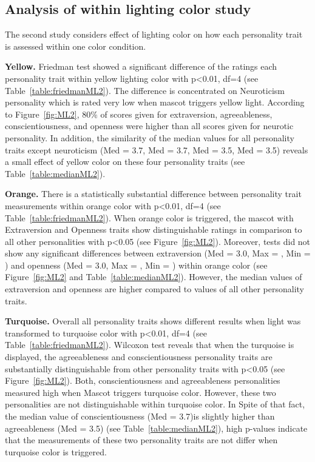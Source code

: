 \subsection{Analysis of within lighting color study}
\label{subsec:MLstudy2}
The second study considers effect of lighting color on how each
personality trait is assessed within one color condition.

\par\textbf{Yellow.}
Friedman test showed a significant difference of the ratings each personality trait
within yellow lighting color with p<0.01, df=4 (see Table~\ref{table:friedmanML2}).
The difference is concentrated on Neuroticism personality which is rated very low when mascot triggers yellow light.
According to Figure~\ref{fig:ML2}, 80\% of scores given for extraversion, agreeableness,
conscientiousness, and openness were higher than all scores given for neurotic personality.
In addition, the similarity of the median values for all personality traits except
neuroticism (Med = 3.7, Med = 3.7, Med = 3.5, Med = 3.5) reveals a small effect of yellow
color on these four personality traits (see Table~\ref{table:medianML2}).

\par\textbf{Orange.}
There is a statistically substantial difference between personality trait measurements within
orange color with p<0.01, df=4 (see Table~\ref{table:friedmanML2}).
When orange color is triggered, the mascot with Extraversion and Openness traits
show distinguishable ratings in comparison to all other personalities with p<0.05 (see Figure~\ref{fig:ML2}).
Moreover, tests did not show any significant differences between extraversion (Med = 3.0, Max = , Min = )
and openness (Med = 3.0, Max = , Min = ) within orange color (see Figure~\ref{fig:ML2} and Table~\ref{table:medianML2}).
However, the median values of extraversion and openness are higher compared to values of all other personality traits.

\par\textbf{Turquoise.}
Overall all personality traits shows different results when light was transformed to turquoise color
with p<0.01, df=4 (see Table~\ref{table:friedmanML2}).
Wilcoxon test reveals that when the turquoise is displayed, the agreeableness and conscientiousness
personality traits are substantially distinguishable from other personality traits with p<0.05 (see Figure~\ref{fig:ML2}).
Both, conscientiousness and agreeableness personalities measured high when Mascot triggers  turquoise color.
However, these two personalities are not distinguishable within turquoise color.
In Spite of that fact, the median value of conscientiousness (Med = 3.7)is slightly higher than
agreeableness (Med = 3.5) (see Table~\ref{table:medianML2}), high p-values indicate that the measurements of
these two personality traits are not differ when turquoise color is triggered.

